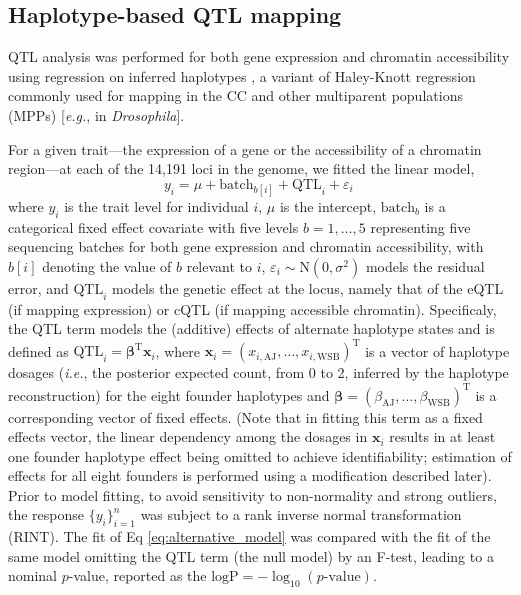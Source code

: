 \documentclass[9pt,twocolumn,twoside]{gsajnl}
\newcommand{\eg}{\emph{e.g.}\xspace}
\newcommand{\ie}{\emph{i.e.}\xspace}
\newcommand{\T}{^\mathrm{T}}
\newcommand{\bbeta}{\boldsymbol{\beta}}
\newcommand{\bx}{\mathbf{x}}
\begin{document}
\subsection{Haplotype-based QTL mapping}

QTL analysis was performed for both gene expression and chromatin accessibility using regression on inferred haplotypes \citep{Mott2000}, a variant of Haley-Knott regression \citep{Haley1992,Martinez1992} commonly used for mapping in the CC \citep{Valdar2006c,Aylor2011,Gralinski2015,Kelada2016,Donoghue2017,Keele2019} and other multiparent populations (MPPs) [\eg, \citet{King2012} in \textit{Drosophila}].

For a given trait---the expression of a gene or the accessibility of a chromatin region---at each of the 14,191 loci in the genome, we fitted the linear model,
\begin{equation}
  y_i = \mu + \text{batch}_{b[i]} + \text{QTL}_i + \varepsilon_i\, 
  \label{eq:alternative_model}
\end{equation}
where $y_{i}$ is the trait level for individual $i$, $\mu$ is the intercept, $\text{batch}_b$ is a categorical fixed effect covariate with five levels $b=1,\dots,5$ representing five sequencing batches for both gene expression and chromatin accessibility, with $b[i]$ denoting the value of $b$ relevant to $i$, $\varepsilon_i\sim\text{N}(0,\sigma^2)$ models the residual error, and $\text{QTL}_{i}$ models the genetic effect at the locus, namely that of the eQTL (if mapping expression) or cQTL (if mapping accessible chromatin). Specificaly, the QTL term models the (additive) effects of alternate haplotype states and is defined as $\text{QTL}_{i}=\bbeta\T\bx_i$, where $\bx_i=(x_{i,\text{AJ}},\dots,x_{i,\text{WSB}})\T$ is a vector of haplotype dosages (\ie, the posterior expected count, from 0 to 2, inferred by the haplotype reconstruction) for the eight founder haplotypes and $\bbeta=(\beta_\text{AJ},\dots,\beta_\text{WSB})\T$ is a corresponding vector of fixed effects. (Note that in fitting this term as a fixed effects vector, the linear dependency among the dosages in $\bx_i$ results in at least one founder haplotype effect being omitted to achieve identifiability; estimation of effects for all eight founders is performed using a modification described later). Prior to model fitting, to avoid sensitivity to non-normality and strong outliers, the response $\{y_i\}^n_{i=1}$ was subject to a rank inverse normal transformation (RINT).
The fit of Eq \ref{eq:alternative_model} was compared with the fit of the same model omitting the QTL term (the null model) by an F-test, leading to a nominal $p$-value, reported as the $\text{logP}=-\log_{10}(\text{$p$-value})$. %
\end{document}
